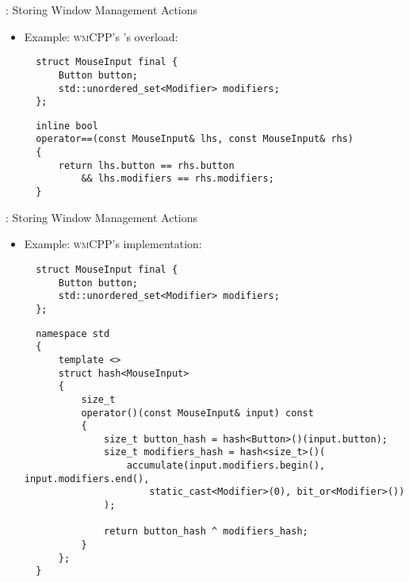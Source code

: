 \begin{frame}[fragile]{\underline{\cpp}: Storing Window Management Actions \hfill {\footnotesize \currentname}}


    \begin{itemize}

        \item Example: \textsc{wmCPP}'s 's  overload:\\[3pt] 
\begin{verbatim}
  struct MouseInput final {
      Button button;
      std::unordered_set<Modifier> modifiers;
  };
\end{verbatim}
\begin{verbatim}
  inline bool
  operator==(const MouseInput& lhs, const MouseInput& rhs)
  {
      return lhs.button == rhs.button
          && lhs.modifiers == rhs.modifiers;
  }
\end{verbatim}

    \end{itemize}

    \vfill

\end{frame}

\begin{frame}[fragile]{\underline{\cpp}: Storing Window Management Actions \hfill {\footnotesize \currentname}}


    \begin{itemize}

        \item Example: \textsc{wmCPP}'s  implementation:\\[3pt] 
\begin{verbatim}
  struct MouseInput final {
      Button button;
      std::unordered_set<Modifier> modifiers;
  };
\end{verbatim}
\begin{verbatim}
  namespace std
  {
      template <>
      struct hash<MouseInput>
      {
          size_t
          operator()(const MouseInput& input) const
          {
              size_t button_hash = hash<Button>()(input.button);
              size_t modifiers_hash = hash<size_t>()(
                  accumulate(input.modifiers.begin(), input.modifiers.end(),
                      static_cast<Modifier>(0), bit_or<Modifier>())
              );

              return button_hash ^ modifiers_hash;
          }
      };
  }
\end{verbatim}

    \end{itemize}

    \vfill

\end{frame}

